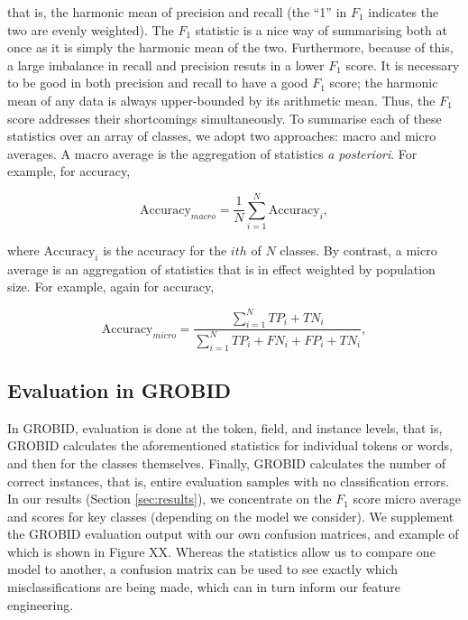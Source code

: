 that is, the harmonic mean of precision and recall (the ``1'' in $F_1$ indicates the two are evenly weighted). The $F_1$ statistic is a nice way of summarising both at once as it is simply the harmonic mean of the two. Furthermore, because of this, a large imbalance in recall and precision resuts in a lower $F_1$ score. It is necessary to be good in both precision and recall to have a good $F_1$ score; the harmonic mean of any data is always upper-bounded by its arithmetic mean. Thus, the $F_1$ score addresses their shortcomings simultaneously. To summarise each of these statistics over an array of classes, we adopt two approaches: macro and micro averages. A macro average is the aggregation of statistics \emph{a posteriori}. For example, for accuracy,

\begin{equation}
\text{Accuracy}_{macro} = \frac{1}{N}\sum_{i=1}^{N}\text{Accuracy}_i,
\label{eq:macroaccuracy}
\end{equation}

where $\text{Accuracy}_i$ is the accuracy for the $ith$ of $N$ classes. By contrast, a micro average is an aggregation of statistics that is in effect weighted by population size. For example, again for accuracy,

\begin{equation}
\text{Accuracy}_{micro} = \frac{\sum_{i=1}^N TP_i + TN_i}{\sum_{i=1}^N TP_i + FN_i + FP_i + TN_i},
\label{eq:microaccuracy}
\end{equation}

\subsection{Evaluation in GROBID}

In GROBID, evaluation is done at the token, field, and instance levels, that is, GROBID calculates the aforementioned statistics for individual tokens or words, and then for the classes themselves. Finally, GROBID calculates the number of correct instances, that is, entire evaluation samples with no classification errors. In our results (Section \ref{sec:results}), we concentrate on the $F_1$ score micro average and scores for key classes (depending on the model we consider). We supplement the GROBID evaluation output with our own confusion matrices, and example of which is shown in Figure XX. Whereas the statistics allow us to compare one model to another, a confusion matrix can be used to see exactly which misclassifications are being made, which can in turn inform our feature engineering.

